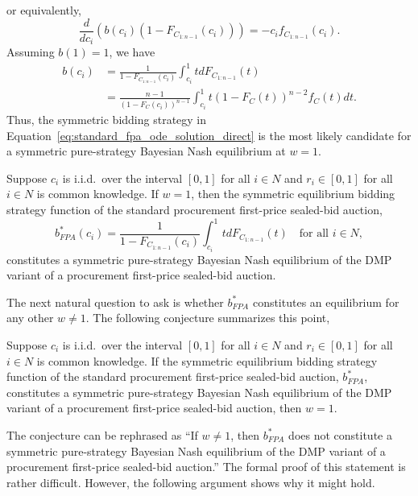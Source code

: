 or equivalently,
\begin{equation*}
	\frac{d}{dc_i}(b(c_i)(1 - F_{C_{1:n-1}}(c_i))) = -c_if_{C_{1:n-1}}(c_i).
\end{equation*}
Assuming $b(1) = 1$, we have
\begin{align}
	\label{eq:standard_fpa_ode_solution_direct}
	b(c_i) &= \frac{1}{1 - F_{C_{1:n-1}}(c_i)}\int_{c_i}^{1} tdF_{C_{1:n-1}}(t) \nonumber\\
	&= \frac{n-1}{(1 - F_{C}(c_i))^{n-1}}\int_{c_i}^1 t(1-F_C(t))^{n-2}f_C(t)dt.
\end{align}
Thus, the symmetric bidding strategy in Equation~\eqref{eq:standard_fpa_ode_solution_direct} is the most likely candidate for a symmetric pure-strategy Bayesian Nash equilibrium at $w=1$.
\begin{proposition}
\label{prop:special_case_w_1_direct}
Suppose $c_i$ is i.i.d.~over the interval $[0,1]$ for all $i\in N$ and $r_i \in [0,1]$ for all $i\in N$ is common knowledge. If $w=1$, then the symmetric equilibrium bidding strategy function of the standard procurement first-price sealed-bid auction,
\begin{equation}
	\label{eq:standard_fpa_direct}
	b^*_{FPA}(c_i) = \frac{1}{1 - F_{C_{1:n-1}}(c_i)}\int_{c_i}^{1} tdF_{C_{1:n-1}}(t) \quad\text{for all } i\in N,
\end{equation}
constitutes a symmetric pure-strategy Bayesian Nash equilibrium of the DMP variant of a procurement first-price sealed-bid auction.
\end{proposition}

The next natural question to ask is whether $b^*_{FPA}$ constitutes an equilibrium for any other $w\neq 1$. The following conjecture summarizes this point,
\begin{conjecture}
\label{conj:special_case_w_1_direct}
Suppose $c_i$ is i.i.d.~over the interval $[0,1]$ for all $i\in N$ and $r_i \in [0,1]$ for all $i\in N$ is common knowledge. If the symmetric equilibrium bidding strategy function of the standard procurement first-price sealed-bid auction, $b^*_{FPA}$, constitutes a symmetric pure-strategy Bayesian Nash equilibrium of the DMP variant of a procurement first-price sealed-bid auction, then $w=1$.
\end{conjecture}
The conjecture can be rephrased as ``If $w\neq 1$, then $b^*_{FPA}$ does not constitute a symmetric pure-strategy Bayesian Nash equilibrium of the DMP variant of a procurement first-price sealed-bid auction.'' The formal proof of this statement is rather difficult. However, the following argument shows why it might hold.


